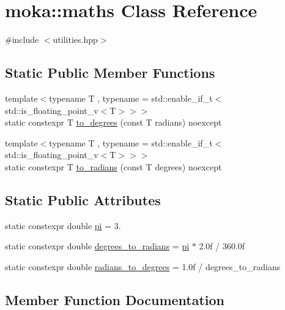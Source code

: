 \hypertarget{classmoka_1_1maths}{}\section{moka\+::maths Class Reference}
\label{classmoka_1_1maths}


{\ttfamily \#include $<$utilities.\+hpp$>$}

\subsection*{Static Public Member Functions}
\begin{DoxyCompactItemize}
\item 
{\footnotesize template$<$typename T , typename  = std\+::enable\+\_\+if\+\_\+t$<$std\+::is\+\_\+floating\+\_\+point\+\_\+v$<$\+T$>$$>$$>$ }\\static constexpr T \mbox{\hyperlink{classmoka_1_1maths_a2e79f58d37cbe28bb8160e26b4fd6be5}{to\+\_\+degrees}} (const T radians) noexcept
\item 
{\footnotesize template$<$typename T , typename  = std\+::enable\+\_\+if\+\_\+t$<$std\+::is\+\_\+floating\+\_\+point\+\_\+v$<$\+T$>$$>$$>$ }\\static constexpr T \mbox{\hyperlink{classmoka_1_1maths_a1aa2a629f86e0989fef0d73e23deab3e}{to\+\_\+radians}} (const T degrees) noexcept
\end{DoxyCompactItemize}
\subsection*{Static Public Attributes}
\begin{DoxyCompactItemize}
\item 
static constexpr double \mbox{\hyperlink{classmoka_1_1maths_a6ef4ef43afc0c5179f724bacbda196b4}{pi}} = 3.
\item 
static constexpr double \mbox{\hyperlink{classmoka_1_1maths_ac1bea7ec8a939b579e3ccefa4c2a2e38}{degrees\+\_\+to\+\_\+radians}} = \mbox{\hyperlink{classmoka_1_1maths_a6ef4ef43afc0c5179f724bacbda196b4}{pi}} $\ast$ 2.\+0f / 360.\+0f
\item 
static constexpr double \mbox{\hyperlink{classmoka_1_1maths_a601fb0ce26476398a25bf91e7d26ef1a}{radians\+\_\+to\+\_\+degrees}} = 1.\+0f / degrees\+\_\+to\+\_\+radians
\end{DoxyCompactItemize}


\subsection{Member Function Documentation}
\mbox{\label{classmoka_1_1maths_a2e79f58d37cbe28bb8160e26b4fd6be5}} 
